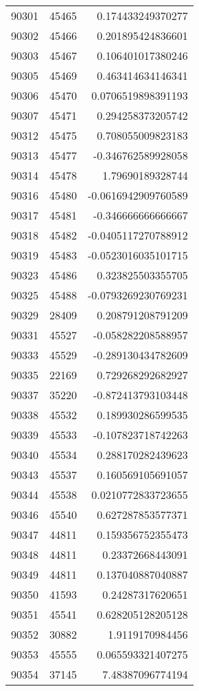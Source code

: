 \begin{tabular}{r | r | r}
90301 & 45465 & 0.174433249370277 \\
90302 & 45466 & 0.201895424836601 \\
90303 & 45467 & 0.106401017380246 \\
90305 & 45469 & 0.463414634146341 \\
90306 & 45470 & 0.0706519898391193 \\
90307 & 45471 & 0.294258373205742 \\
90312 & 45475 & 0.708055009823183 \\
90313 & 45477 & -0.346762589928058 \\
90314 & 45478 & 1.79690189328744 \\
90316 & 45480 & -0.0616942909760589 \\
90317 & 45481 & -0.346666666666667 \\
90318 & 45482 & -0.0405117270788912 \\
90319 & 45483 & -0.0523016035101715 \\
90323 & 45486 & 0.323825503355705 \\
90325 & 45488 & -0.0793269230769231 \\
90329 & 28409 & 0.208791208791209 \\
90331 & 45527 & -0.058282208588957 \\
90333 & 45529 & -0.289130434782609 \\
90335 & 22169 & 0.729268292682927 \\
90337 & 35220 & -0.872413793103448 \\
90338 & 45532 & 0.189930286599535 \\
90339 & 45533 & -0.107823718742263 \\
90340 & 45534 & 0.288170282439623 \\
90343 & 45537 & 0.160569105691057 \\
90344 & 45538 & 0.0210772833723655 \\
90346 & 45540 & 0.627287853577371 \\
90347 & 44811 & 0.159356752355473 \\
90348 & 44811 & 0.23372668443091 \\
90349 & 44811 & 0.137040887040887 \\
90350 & 41593 & 0.24287317620651 \\
90351 & 45541 & 0.628205128205128 \\
90352 & 30882 & 1.9119170984456 \\
90353 & 45555 & 0.065593321407275 \\
90354 & 37145 & 7.48387096774194 \\

\end{tabular}
